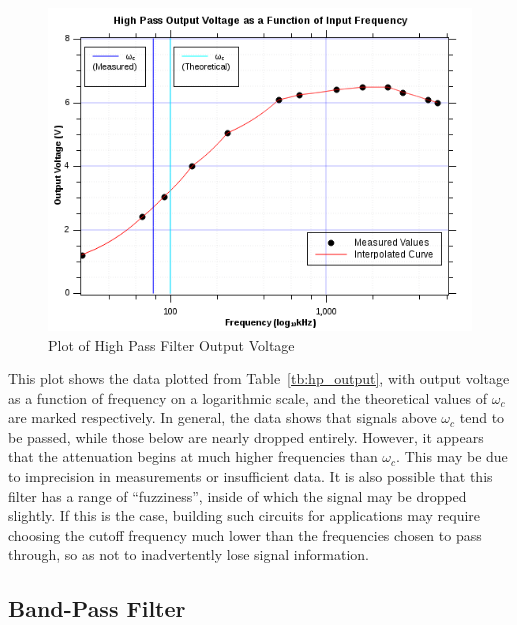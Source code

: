 \documentclass[twocolumn,english]{IEEEtran}
\theoremstyle{plain}
\theoremstyle{plain}
\begin{document}
		\begin{figure}[H]
			\begin{centering}
			\begin{center}
			\includegraphics[width=\linewidth]{./Graphs/HighPass.png}
			\caption{Plot of High Pass Filter Output Voltage}
			\label{graph:hp_output}
			\end{center}
			\par\end{centering}
		\end{figure}
		This plot shows the data plotted from Table~\ref{tb:hp_output}, with output voltage as a function of frequency on a logarithmic scale, and the theoretical values of $\omega_c$ are marked respectively. In general, the data shows that signals above $\omega_c$ tend to be passed, while those below are nearly dropped entirely. However, it appears that the attenuation begins at much higher frequencies than $\omega_c$. This may be due to imprecision in measurements or insufficient data. It is also possible that this filter has a range of ``fuzziness'', inside of which the signal may be dropped slightly. If this is the case, building such circuits for applications may require choosing the cutoff frequency much lower than the frequencies chosen to pass through, so as not to inadvertently lose signal information.

	\subsection{Band-Pass Filter}
\end{document}
